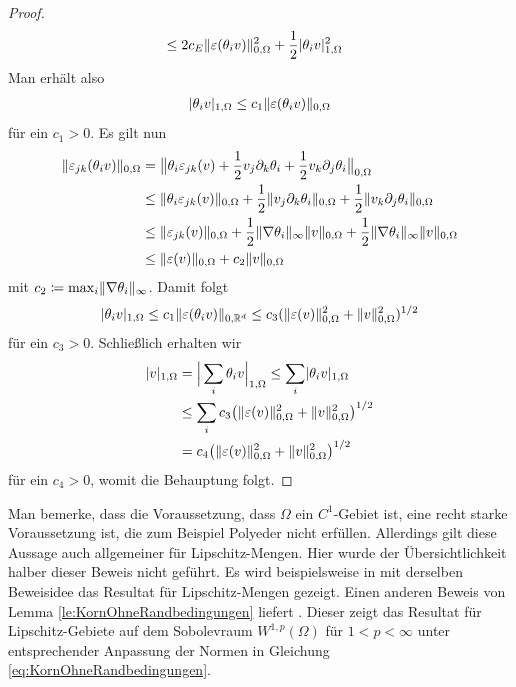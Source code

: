 \documentclass{scrartcl}
\def\R{\mathbb{R}}
\def\e{\varepsilon}
\DeclarePairedDelimiter{\abs}{\lvert}{\rvert}
\DeclarePairedDelimiter{\norm}{\lVert}{\rVert}
\begin{document}
\begin{proof}
\begin{align*}
		&\leq 2c_{E}\norm{\e(\theta_iv)}_{0,\Omega}^2+\frac{1}{2}\abs{\theta_iv}_{1,\Omega}^2
	\end{align*}
	Man erhält also
	\begin{align*}
		\abs{\theta_iv}_{1,\Omega}
		\leq c_1\norm{\e(\theta_iv)}_{0,\Omega}
	\end{align*}
	für ein $c_1>0$. Es gilt nun
	\begin{align*}
		\norm{\e_{jk}(\theta_i v)}_{0,\Omega}
		&= \big\lVert\theta_i\e_{jk}(v)+\frac{1}{2}v_j\partial_k\theta_i+\frac{1}{2}v_k\partial_j\theta_i\big\rVert_{0,\Omega} \\
		&\leq \norm{\theta_i\e_{jk}(v)}_{0,\Omega}+\frac{1}{2}\norm{v_j\partial_k\theta_i}_{0,\Omega}+\frac{1}{2}\norm{v_k\partial_j\theta_i}_{0,\Omega} \\
		&\leq \norm{\e_{jk}(v)}_{0,\Omega}+\frac{1}{2}\norm{\nabla\theta_i}_{\infty}\norm{v}_{0,\Omega}+\frac{1}{2}\norm{\nabla\theta_i}_{\infty}\norm{v}_{0,\Omega} \\
		&\leq \norm{\e(v)}_{0,\Omega} + c_2\norm{v}_{0,\Omega}
	\end{align*}
	mit $c_2\coloneqq \max_i\norm{\nabla \theta_i}_\infty$.
	Damit folgt
	\begin{align*}
		\abs{\theta_iv}_{1,\Omega}
		\leq c_1\norm{\e(\theta_iv)}_{0,\R^d}
		\leq c_3(\norm{\e(v)}_{0,\Omega}^2 + \norm{v}_{0,\Omega}^2)^{1/2}
	\end{align*}
	für ein $c_3>0$. Schließlich erhalten wir
	\begin{align*}
		\abs{v}_{1,\Omega}
		&= \Big\lvert\sum_i\theta_iv\Big\rvert_{1,\Omega} 
		\leq \sum_i\abs{\theta_iv}_{1,\Omega} \\
		&\leq \sum_ic_3\big(\norm{\e(v)}_{0,\Omega}^2 + \norm{v}_{0,\Omega}^2\big)^{1/2} \\
		&= c_4\big(\norm{\e(v)}_{0,\Omega}^2 + \norm{v}_{0,\Omega}^2\big)^{1/2}
	\end{align*}
	für ein $c_4>0$, womit die Behauptung folgt.
\end{proof}
Man bemerke, dass die Voraussetzung, dass $\Omega$ ein $C^1$-Gebiet ist, eine recht starke Voraussetzung ist, die zum Beispiel Polyeder nicht erfüllen. 
Allerdings gilt diese Aussage auch allgemeiner für Lipschitz-Mengen. Hier wurde der Übersichtlichkeit halber dieser Beweis nicht geführt. 
Es wird beispielsweise in \cite{Nit-1981} mit derselben Beweisidee das Resultat für Lipschitz-Mengen gezeigt.
Einen anderen Beweis von Lemma \ref{le:KornOhneRandbedingungen} liefert \cite[S.106ff.]{Kik-1988}.
Dieser zeigt das Resultat für Lipschitz-Gebiete auf dem Sobolevraum $W^{1,p}(\Omega)$ für $1<p<\infty$ unter entsprechender Anpassung der Normen in Gleichung \eqref{eq:KornOhneRandbedingungen}.
\end{document}
